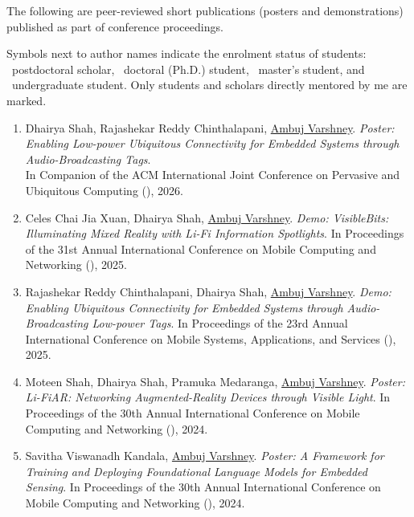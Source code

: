 
The following are peer-reviewed short publications (posters and demonstrations) published as part of conference proceedings.

\providecommand{\symbollegend}[1]{#1}
\symbollegend{Symbols next to author names indicate the enrolment status of students: \postdoc~postdoctoral scholar, \phd~doctoral (Ph.D.) student, \pg~master's student, and \ug~undergraduate student. Only students and scholars directly mentored by me are marked.}

\begin{enumerate}


\item Dhairya Shah\phd, Rajashekar Reddy Chinthalapani\phd, \underline{Ambuj Varshney}. 
\emph{Poster: Enabling Low-power Ubiquitous Connectivity for Embedded Systems through Audio-Broadcasting Tags}.\\
In Companion of the ACM International Joint Conference on Pervasive and Ubiquitous Computing (), 2026.

\item Celes Chai Jia Xuan\ug, Dhairya Shah\phd, \underline{Ambuj Varshney}. 
\emph{Demo: VisibleBits: Illuminating Mixed Reality with Li-Fi Information Spotlights}. 
In Proceedings of the 31st Annual International Conference on Mobile Computing and Networking (), 2025.

\item Rajashekar Reddy Chinthalapani\phd, Dhairya Shah\phd, \underline{Ambuj Varshney}. 
\emph{Demo: Enabling Ubiquitous Connectivity for Embedded Systems through Audio-Broadcasting Low-power Tags}. 
In Proceedings of the 23rd Annual International Conference on Mobile Systems, Applications, and Services (), 2025.


\item Moteen Shah\ug, Dhairya Shah\phd, Pramuka Medaranga\phd, \underline{Ambuj Varshney}. 
\emph{Poster: Li-FiAR: Networking Augmented-Reality Devices through Visible Light}. 
In Proceedings of the 30th Annual International Conference on Mobile Computing and Networking (), 2024.

\item Savitha Viswanadh Kandala\phd, \underline{Ambuj Varshney}. 
\emph{Poster: A Framework for Training and Deploying Foundational Language Models for Embedded Sensing}. 
In Proceedings of the 30th Annual International Conference on Mobile Computing and Networking (), 2024.


\end{enumerate}
